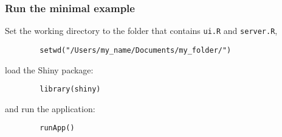 \documentclass{beamer}
\begin{document}
	\begin{frame}[fragile]
		\frametitle{Run the minimal example}

		Set the working directory to the folder that contains \verb|ui.R| and \verb|server.R|,

		\vspace{1em}
		
		\begin{exampleblock}{}
		\begin{BVerbatim}
		setwd("/Users/my_name/Documents/my_folder/")
		\end{BVerbatim}
		\end{exampleblock}{}

		\vspace{1em}

		load the Shiny package:

		\vspace{1em}
		
		\begin{exampleblock}{}
		\begin{BVerbatim}
		library(shiny)
		\end{BVerbatim}
		\end{exampleblock}{}

		\vspace{1em}

		and run the application:

		\vspace{1em}
		
		\begin{exampleblock}{}
		\begin{BVerbatim}
		runApp()
		\end{BVerbatim}
		\end{exampleblock}{}

	\end{frame}
\end{document}
